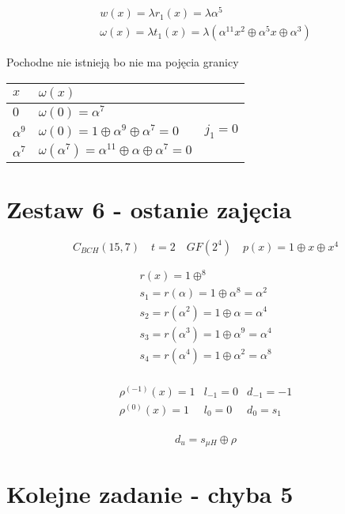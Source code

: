 \documentclass[12pt]{article}
\begin{document}
\begin{multline*}
    & w(x) = \lambda r_1(x) = \lambda\alpha^5 & \\
    & \omega(x) = \lambda t_1(x)  = \lambda (\alpha^{11}x^2\oplus\alpha^5x\oplus \alpha^3) &
\end{multline*}

Pochodne nie istnieją bo nie ma pojęcia granicy 


\begin{table}[h]
\begin{tabular}{lll}
    $x$ & $\omega(x) $& \\ \hline
    $0$ & $ \omega(0)=\alpha^7$ &  \\
    $\alpha^9$ & $\omega(0) = 1 \oplus \alpha^9 \oplus \alpha^7 = 0 $ & $j_1=0$ \\
    $\alpha^7$ & $\omega(\alpha^7) = \alpha^11 \oplus \alpha \oplus \alpha^7 =0 $ & \\
\end{tabular}
\end{table}

\section*{Zestaw 6 - ostanie zajęcia}

$$C_{BCH}(15,7) \quad t=2 \quad GF(2^4) \quad p(x)=1\oplus x \oplus x^4 $$

\begin{multline*}
    &r(x) = 1\oplus ^8 & \\ 
    &s_1 = r(\alpha ) =   1 \oplus \alpha^8 = \alpha ^2 & \\
    &s_2 = r(\alpha ^2) =  1 \oplus \alpha = \alpha ^4 & \\
    &s_3 = r(\alpha ^3) = 1 \oplus \alpha ^9  = \alpha ^4 & \\
    &s_4 = r(\alpha ^4) = 1 \oplus \alpha ^2  = \alpha ^8 & \\
\end{multline*}

\begin{multline*}
    &\rho^{(-1)}(x)=1 & l_{-1}=0 & d_{-1}=-1  & \\
    &\rho^{(0)}(x)=1 & l_{0}=0 & d_{0}=s_1   & \\
\end{multline*}

$$ d_u=s_{\mu H}\oplus \rho  $$

\section*{Kolejne zadanie - chyba 5} 
\end{document}
